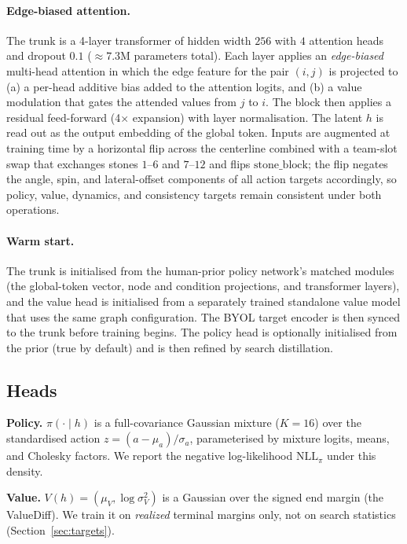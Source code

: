 \documentclass[11pt]{article}
\begin{document}
\paragraph{Edge-biased attention.} The trunk is a 4-layer transformer of
hidden width $256$ with $4$ attention heads and dropout $0.1$
($\approx 7.3\text{M}$ parameters total). Each layer applies an
\emph{edge-biased} multi-head attention in which the edge feature for the
pair $(i,j)$ is projected to (a) a per-head additive bias added to the
attention logits, and (b) a value modulation that gates the attended values
from $j$ to $i$. The block then applies a residual feed-forward (4$\times$
expansion) with layer normalisation. The latent $h$ is read out as the
output embedding of the global token. Inputs are augmented at training time
by a horizontal flip across the centerline combined with a team-slot swap
that exchanges stones $1$--$6$ and $7$--$12$ and flips
$\text{stone\_block}$; the flip negates the angle, spin, and lateral-offset
components of all action targets accordingly, so policy, value, dynamics,
and consistency targets remain consistent under both operations.

\paragraph{Warm start.} The trunk is initialised from the human-prior policy
network's matched modules (the global-token vector, node and condition
projections, and transformer layers), and the value head is initialised from
a separately trained standalone value model that uses the same graph
configuration. The BYOL target encoder is then synced to the trunk before
training begins. The policy head is optionally initialised from the prior
(true by default) and is then refined by search distillation.

\subsection{Heads}
\label{sec:heads}
\textbf{Policy.} $\pi(\cdot\mid h)$ is a full-covariance Gaussian mixture
($K=16$) over the standardised action $z=(a-\mu_a)/\sigma_a$, parameterised
by mixture logits, means, and Cholesky factors. We report the negative
log-likelihood $\mathrm{NLL}_\pi$ under this density.

\textbf{Value.} $V(h)=(\mu_V,\log\sigma_V^2)$ is a Gaussian over the signed
end margin (the ValueDiff). We train it on \emph{realized} terminal margins
only, not on search statistics (Section~\ref{sec:targets}).
\end{document}
